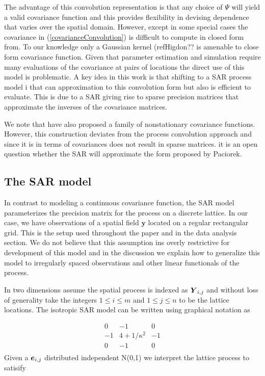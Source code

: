 \documentclass[review]{elsarticle}
\begin{document}
The advantage of this convolution representation is that any choice of $\Psi$ will yield a valid covariance function and this provides flexibility in devising dependence that varies over the spatial domain.  However, except in some special cases the covariance  in  (\ref{covarianceConvolution}) is difficult to compute in closed form from. To our knowledge only a Gaussian kernel (ref{Higdon??} is amenable to close form covariance function. Given that parameter estimation and simulation require many evaluations of the covariance at pairs of locations the direct use of this model is problematic. A key idea in this work is that shifting to a SAR process model i that can approximation to this convolution form but also is efficient to evaluate.  
This is due to a SAR giving rise to sparse precision matrices that approximate the inverses of the covariance matrices. 

We note that \citet{paciorek2004nonstationary} have also proposed a family of nonstationary covariance functions.  However, this construction deviates from the process convolution approach and  since it is in terms of covariances does not result in sparse matrices. it is an open question whether the SAR will approximate the form proposed by Paciorek. 

\subsection{The SAR model}

In contrast to modeling a continuous covariance function, the SAR model parameterizes the precision matrix for the process on a discrete lattice. In our case, we have observations of a spatial field $\mathbf{y}$ located on a regular rectangular grid. This is the setup used throughout the paper and in the data analysis section. 
We do not believe that this assumption ins overly restrictive for development of this model and in the discussion we explain how to generalize this model to irregularly spaced observations and other linear functionals of the process. 

In two dimensions  assume the spatial process is indexed as $\mbox{\boldmath $Y$}_{i,j}$  and without loss of generality take the integers  $1 \le i \le m$ and $1\le j \le n$  to be the lattice locations.    The 
isotropic SAR model can be written using graphical notation as 

\begin{equation}
\label{e:2}
    \begin{array}{c|c|c}
      0 & -1 & 0 \\
      \hline
      -1 & 4+1/\kappa^2 & -1 \\
      \hline
      0 & -1 & 0 \\
    \end{array}
\end{equation} 
Given a $\mbox{\boldmath $e$}_{i,j}$ distributed independent  N(0,1)  we interpret the lattice process to satisify 
 
\end{document}
